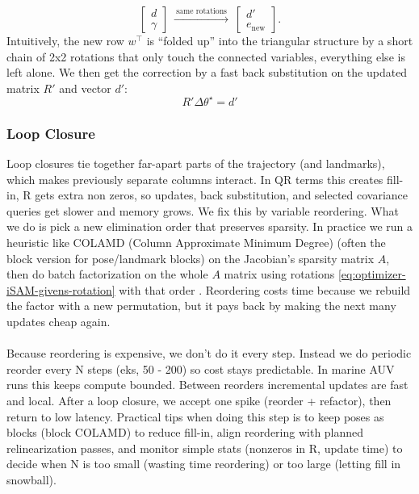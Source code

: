 $$
    \begin{bmatrix} d\\ \gamma \end{bmatrix}
    \ \xrightarrow{\ \text{same rotations}\ }\ 
    \begin{bmatrix} d'\\ e_{\text{new}} \end{bmatrix}.
$$
Intuitively, the new row $w^\top$ is ``folded up'' into the triangular structure by a short chain of 2x2 rotations that only touch the connected variables, everything else is left alone. We then get the correction by a fast back substitution on the updated matrix $R'$ and vector $d'$:
$$
    R'\Delta\theta^\star = d'
$$



\subsubsection{Loop Closure}
\noindent
Loop closures tie together far-apart parts of the trajectory (and landmarks), which makes previously separate columns interact. In QR terms this creates fill-in, R gets extra non zeros, so updates, back substitution, and selected covariance queries get slower and memory grows. We fix this by variable reordering. What we do is pick a new elimination order that preserves sparsity. In practice we run a heuristic like \gls{COLAMD} (Column Approximate Minimum Degree) (often the block version for pose/landmark blocks) on the Jacobian's sparsity matrix $A$, then do batch factorization on the whole $A$ matrix using rotations \eqref{eq:optimizer-iSAM-givens-rotation} with that order \cite{iSAM_paper}. Reordering costs time because we rebuild the factor with a new permutation, but it pays back by making the next many updates cheap again.
\\ \\
Because reordering is expensive, we don't do it every step. Instead we do periodic reorder every N steps (eks, 50 - 200) so cost stays predictable. In marine \gls{AUV} runs this keeps compute bounded. Between reorders incremental updates are fast and local. After a loop closure, we accept one spike (reorder + refactor), then return to low latency. Practical tips when doing this step is to keep poses as blocks (block \gls{COLAMD}) to reduce fill-in, align reordering with planned relinearization passes, and monitor simple stats (nonzeros in R, update time) to decide when N is too small (wasting time reordering) or too large (letting fill in snowball).  



